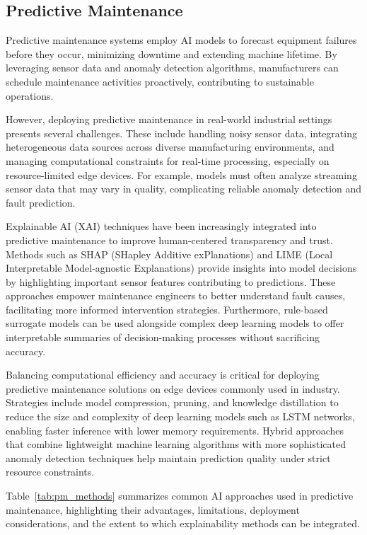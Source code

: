 \documentclass[sigconf]{acmart}
\begin{document}
\subsection{Predictive Maintenance}
Predictive maintenance systems employ AI models to forecast equipment failures before they occur, minimizing downtime and extending machine lifetime. By leveraging sensor data and anomaly detection algorithms, manufacturers can schedule maintenance activities proactively, contributing to sustainable operations.

However, deploying predictive maintenance in real-world industrial settings presents several challenges. These include handling noisy sensor data, integrating heterogeneous data sources across diverse manufacturing environments, and managing computational constraints for real-time processing, especially on resource-limited edge devices. For example, models must often analyze streaming sensor data that may vary in quality, complicating reliable anomaly detection and fault prediction.

Explainable AI (XAI) techniques have been increasingly integrated into predictive maintenance to improve human-centered transparency and trust. Methods such as SHAP (SHapley Additive exPlanations) and LIME (Local Interpretable Model-agnostic Explanations) provide insights into model decisions by highlighting important sensor features contributing to predictions. These approaches empower maintenance engineers to better understand fault causes, facilitating more informed intervention strategies. Furthermore, rule-based surrogate models can be used alongside complex deep learning models to offer interpretable summaries of decision-making processes without sacrificing accuracy.

Balancing computational efficiency and accuracy is critical for deploying predictive maintenance solutions on edge devices commonly used in industry. Strategies include model compression, pruning, and knowledge distillation to reduce the size and complexity of deep learning models such as LSTM networks, enabling faster inference with lower memory requirements. Hybrid approaches that combine lightweight machine learning algorithms with more sophisticated anomaly detection techniques help maintain prediction quality under strict resource constraints.

Table~\ref{tab:pm_methods} summarizes common AI approaches used in predictive maintenance, highlighting their advantages, limitations, deployment considerations, and the extent to which explainability methods can be integrated.
\end{document}
